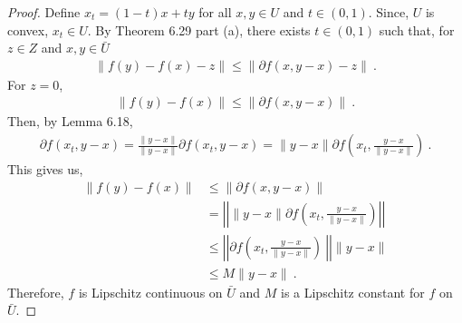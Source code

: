 \begin{questions}


\begin{solution}
  \begin{proof}
  Define $x_t = (1-t)x +ty$ for all $x,y \in U$ and $t \in (0,1)$. Since, $U$ is convex, $x_t \in U$. By Theorem 6.29 part (a), there exists $t \in (0,1)$ such that, for $z \in Z$ and $x,y \in \bar{U}$
  \begin{align*}
  \|f(y) - f(x) - z\| \leq \| \partial f(x,y-x) -z\|~.
  \end{align*}
  For $z = 0$,
  \begin{align*}
  \|f(y) - f(x)\| \leq \| \partial f(x,y-x)\|~.
  \end{align*}
  Then, by Lemma 6.18,
  \begin{align*}
  \partial f(x_t, y-x) = \frac{\|y-x\|}{\|y - x\|} \partial f(x_t,y-x) = \|y-x\| \partial f\left(x_t, \frac{y-x}{\|y-x\|}\right)~.
  \end{align*}
This gives us,
\begin{align*}
\|f(y) - f(x)\| &\leq \| \partial f(x,y-x)\| \\ 
&= \left| \left| \|y-x\| \partial f\left(x_t, \frac{y-x}{\|y-x\|}\right) \right| \right| \\
&\leq \left| \left| \partial f\left(x_t, \frac{y-x}{\|y-x\|}\right)\ \right| \right| \|y-x\| \\
& \leq M \|y-x\|~.
\end{align*}
Therefore, $f$ is Lipschitz continuous on $\bar{U}$ and $M$ is a Lipschitz constant for $f$ on $\bar{U}$.
\end{proof}
\end{solution}
\newpage
{}
\end{questions}
